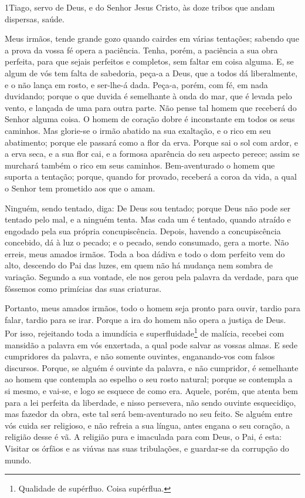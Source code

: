 
\lettrine{1} Tiago, servo de Deus, e do Senhor Jesus Cristo,
às doze tribos que andam dispersas, saúde.

Meus irmãos, tende grande gozo quando cairdes em várias tentações;
sabendo que a prova da vossa fé opera a paciência. Tenha,
porém, a paciência a sua obra perfeita, para que sejais perfeitos e
completos, sem faltar em coisa alguma. E, se algum de vós tem
falta de sabedoria, peça-a a Deus, que a todos dá liberalmente, e o
não lança em rosto, e ser-lhe-á dada. Peça-a, porém, com fé, em
nada duvidando; porque o que duvida é semelhante à onda do mar, que
é levada pelo vento, e lançada de uma para outra parte. Não
pense tal homem que receberá do Senhor alguma coisa. O homem de
coração dobre é inconstante em todos os seus caminhos. Mas
glorie-se o irmão abatido na sua exaltação, e o rico em seu
abatimento; porque ele passará como a flor da erva. Porque
sai o sol com ardor, e a erva seca, e a sua flor cai, e a formosa
aparência do seu aspecto perece; assim se murchará também o rico em
seus caminhos. Bem-aventurado o homem que suporta a tentação;
porque, quando for provado, receberá a coroa da vida, a qual o
Senhor tem prometido aos que o amam.

Ninguém, sendo tentado, diga: De Deus sou tentado; porque Deus
não pode ser tentado pelo mal, e a ninguém tenta. Mas cada um
é tentado, quando atraído e engodado pela sua própria
concupiscência. Depois, havendo a concupiscência concebido,
dá à luz o pecado; e o pecado, sendo consumado, gera a morte.
Não erreis, meus amados irmãos. Toda a boa dádiva e
todo o dom perfeito vem do alto, descendo do Pai das luzes, em quem
não há mudança nem sombra de variação. Segundo a sua vontade,
ele nos gerou pela palavra da verdade, para que fôssemos como
primícias das suas criaturas.

Portanto, meus amados irmãos, todo o homem seja pronto para
ouvir, tardio para falar, tardio para se irar. Porque a ira
do homem não opera a justiça de Deus. Por isso, rejeitando
toda a imundícia e superfluidade\footnote{Qualidade de supérfluo.
Coisa supérflua.} de malícia, recebei com mansidão a palavra em vós
enxertada, a qual pode salvar as vossas almas. E sede
cumpridores da palavra, e não somente ouvintes, enganando-vos com
falsos discursos. Porque, se alguém é ouvinte da palavra, e
não cumpridor, é semelhante ao homem que contempla ao espelho o seu
rosto natural; porque se contempla a si mesmo, e vai-se, e
logo se esquece de como era. Aquele, porém, que atenta bem
para a lei perfeita da liberdade, e nisso persevera, não sendo
ouvinte esquecidiço, mas fazedor da obra, este tal será
bem-aventurado no seu feito. Se alguém entre vós cuida ser
religioso, e não refreia a sua língua, antes engana o seu coração, a
religião desse é vã. A religião pura e imaculada para com
Deus, o Pai, é esta: Visitar os órfãos e as viúvas nas suas
tribulações, e guardar-se da corrupção do mundo.

